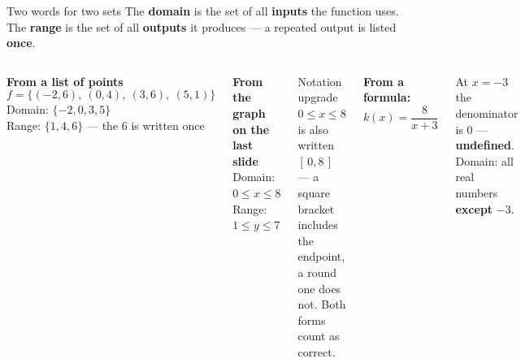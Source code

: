 \documentclass[aspectratio=169, 11pt]{beamer}
\begin{document}
\begin{frame}[t, plain]

  \begin{block}{Two words for two sets}
    The \textbf{domain} is the set of all \textbf{inputs} the function uses. The
    \textbf{range} is the set of all \textbf{outputs} it produces --- a repeated
    output is listed \textbf{once}.
  \end{block}

  \medskip
  \begin{columns}[T]
      \textbf{From a list of points}
      \[ f = \{(-2, 6),\ (0, 4),\ (3, 6),\ (5, 1)\} \]
      Domain: \(\{-2, 0, 3, 5\}\) \\[3pt]
      Range: \(\{1, 4, 6\}\) --- the 6 is written once

      \medskip
      \textbf{From the graph on the last slide}\\[3pt]
      Domain: \(0 \le x \le 8\) \quad Range: \(1 \le y \le 7\)

      \begin{block}{Notation upgrade}
        \(0 \le x \le 8\) is also written \([\,0, 8\,]\) --- a square bracket
        includes the endpoint, a round one does not. Both forms count as
        correct.
      \end{block}

      \medskip
      \textbf{From a formula:} \(k(x) = \dfrac{8}{x + 3}\)

      \smallskip
      At \(x = -3\) the denominator is 0 --- \textbf{undefined}. Domain: all
      real numbers \textbf{except} \(-3\).
  \end{columns}
\end{frame}
\end{document}
